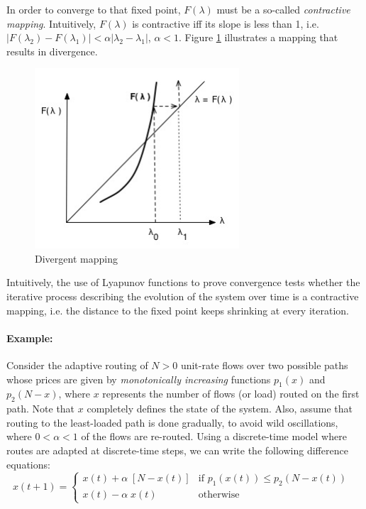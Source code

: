 \documentclass{article}
\begin{document}
In order to converge to that fixed point, $F(\lambda)$ must be a so-called {\em contractive mapping}.
Intuitively,
$F(\lambda)$ is contractive iff its slope is less than 1, i.e.
$|F(\lambda_2) - F(\lambda_1)| < \alpha |\lambda_2 - \lambda_1|$, $\alpha < 1$.
Figure \ref{fig:non-contractive} illustrates a mapping that results in divergence.

\begin{figure}[htbp]
   \centering
   \includegraphics[width=3in]{figures/non-contractive.jpg} %
   \caption{Divergent mapping}
   \label{fig:non-contractive}
\end{figure}

Intuitively, the use of Lyapunov functions to prove convergence tests whether the iterative process
describing the evolution of the system over time is a contractive mapping, i.e. 
the distance to the fixed point keeps shrinking at every iteration.

\paragraph{Example:}
Consider the adaptive routing of $N > 0$ unit-rate flows over two possible paths whose prices are given by
{\em monotonically increasing} functions
$p_1(x)$ and $p_2(N-x)$, where $x$ represents the number of flows (or load) routed on the first path.
Note that $x$ completely defines the state of the system.
Also, assume that routing to the least-loaded path is done gradually, to avoid wild oscillations,
where $0 < \alpha < 1$ of the flows are re-routed.
Using a discrete-time model where routes are adapted at discrete-time steps, 
we can write the following difference equations:
$$
x(t+1) = \left\{ \begin{array}{rl} 
               x(t) + \alpha \; [N - x(t)]  & \mbox{if  $p_1(x(t)) \leq p_2(N -  x(t))$ } \\
               x(t) - \alpha \; x(t) & \mbox{otherwise}
                        \end{array} \right.
$$
\end{document}
